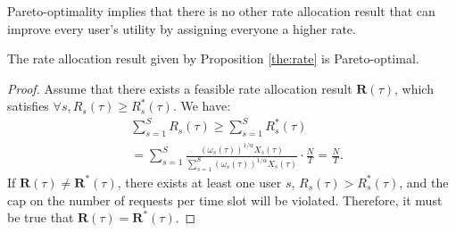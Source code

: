 	Pareto-optimality implies that there is no other rate allocation result that can improve every user's utility by assigning everyone a higher rate. 
	
	\begin{theorem}
		The rate allocation result given by Proposition \ref{the:rate} is Pareto-optimal.  
	\end{theorem} 
	\begin{proof}
		Assume that there exists a feasible rate allocation result $\pmb{R}(\tau)$, which satisfies $\forall s, R_s(\tau) \ge R_s^*(\tau)$. We have:
		\begin{displaymath}
		\begin{split}
		&\sum\limits_{s=1}^S R_s(\tau) \ge \sum\limits_{s=1}^S R_s^*(\tau) \\
		&= \sum\limits_{s=1}^S\frac{(\omega_s(\tau))^{1/\alpha} X_s(\tau) }{\sum_{s=1}^S (\omega_s(\tau))^{1/\alpha} X_s(\tau)}\cdot\frac{N}{T} =\frac{N}{T}.
		\end{split}
		\end{displaymath}
		If $\pmb{R}(\tau) \ne \pmb{R}^*(\tau)$, there exists at least one user $s$, $R_s(\tau) > R_s^*(\tau)$, and the cap on the number of requests per time slot will be violated. Therefore, it must be true that $\pmb{R}(\tau) =\pmb{R}^*(\tau)$. 
	\end{proof}

  	




	
	
	
